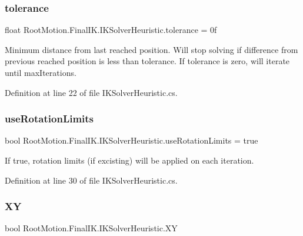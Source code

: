 \subsubsection{\texorpdfstring{tolerance}{tolerance}}
{\footnotesize\ttfamily float Root\+Motion.\+Final\+I\+K.\+I\+K\+Solver\+Heuristic.\+tolerance = 0f}



Minimum distance from last reached position. Will stop solving if difference from previous reached position is less than tolerance. If tolerance is zero, will iterate until max\+Iterations. 



Definition at line 22 of file I\+K\+Solver\+Heuristic.\+cs.

\mbox{\label{class_root_motion_1_1_final_i_k_1_1_i_k_solver_heuristic_aedb395011d886df6e4a534b30d6c7962}} 
\subsubsection{\texorpdfstring{use\+Rotation\+Limits}{useRotationLimits}}
{\footnotesize\ttfamily bool Root\+Motion.\+Final\+I\+K.\+I\+K\+Solver\+Heuristic.\+use\+Rotation\+Limits = true}



If true, rotation limits (if excisting) will be applied on each iteration. 



Definition at line 30 of file I\+K\+Solver\+Heuristic.\+cs.

\mbox{\label{class_root_motion_1_1_final_i_k_1_1_i_k_solver_heuristic_a231fb79dcb25a4717507124dfde88703}} 
\subsubsection{\texorpdfstring{XY}{XY}}
{\footnotesize\ttfamily bool Root\+Motion.\+Final\+I\+K.\+I\+K\+Solver\+Heuristic.\+XY}



